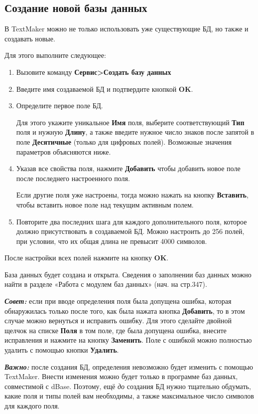 ﻿\documentclass[a4paper,10pt]{article}
\begin{document}
\subsection{Создание новой базы данных}
В TextMaker можно не только использовать уже существующие БД, но также и создавать новые.

Для этого выполните следующее:
\begin{enumerate}
 \item Вызовите команду \textbf{Сервис>Создать базу данных}
 \item Введите имя создаваемой БД и подтвердите кнопкой \textbf{OK}.
 \item Определите первое поле БД.
 
 Для этого укажите уникальное \textbf{Имя} поля, выберите соответствующий \textbf{Тип} поля и нужную \textbf{Длину}, а также введите нужное число знаков после запятой в поле \textbf{Десятичные} (только для цифровых полей). Возможные значения параметров объясняются ниже.
\item Указав все свойства поля, нажмите \textbf{Добавить} чтобы добавить новое поле после последнего настроенного поля.

Если другие поля уже настроены, тогда можно нажать на кнопку \textbf{Вставить}, чтобы вставить новое поле над текущим активным полем.
\item Повторите два последних шага для каждого дополнительного поля, которое должно присутствовать в создаваемой БД. Можно настроить до 256 полей, при условии, что их общая длина не превысит 4000 символов.
 \end{enumerate}

 После настройки всех полей нажмите на кнопку \textbf{OK}.
 
 База данных будет создана и открыта. Сведения о заполнении баз данных можно найти в разделе «Работа с модулем баз данных» (нач. на стр.347).
 
 \textbf{\textit{Совет:}} если при вводе определения поля была допущена ошибка, которая обнаружилась только после того, как была нажата кнопка \textbf{Добавить}, то в этом случае можно вернуться и исправить ошибку. Для этого сделайте двойной щелчок на списке \textbf{Поля} в том поле, где была допущена ошибка, внесите исправления и нажмите на кнопку \textbf{Заменить}. Поле с ошибкой можно полностью удалить с помощью кнопки \textbf{Удалить}.
 
 \begin{mdframed}[backgroundcolor=blue!10]
\textbf{\textit{Важно:}} после создания БД, определения невозможно будет изменить с помощью TextMaker. Внести изменения можно будет только в программе баз данных, совместимой с dBase. Поэтому, ещё \textit{до} создания БД нужно тщательно обдумать, какие поля и типы полей вам необходимы, а также максимальное число символов для каждого поля.
\end{mdframed}
\end{document}
